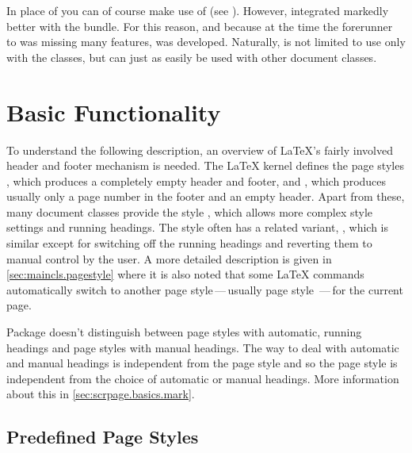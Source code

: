 \begin{Explain}
  In place of  you can of course make use of
   (see \cite{package:fancyhdr}). However,
   integrated markedly better with the {\KOMAScript}
  bundle. For this reason, and because at the time the forerunner to
   was missing many features,  was
  developed. Naturally,  is not limited to use only
  with the {\KOMAScript} classes, but can just as easily be used with
  other document classes.
\end{Explain}


\section{Basic Functionality}\label{sec:scrpage.basics}

\begin{Explain}%
  To understand the following description, an overview of {\LaTeX}'s fairly
  involved header and footer mechanism is needed.  The {\LaTeX} kernel defines
  the page styles , which produces a completely empty header
  and footer, and , which produces usually only a page number
  in the footer and an empty header.  Apart from these, many document classes
  provide the style , which allows more complex style
  settings and running
  headings.  The
   style often has a related variant,
  , which is similar except for switching off the
  running headings and reverting them to manual control
  by the user.  A more detailed description is given in
  \autoref{sec:maincls.pagestyle} where it is also noted that some {\LaTeX}
  commands automatically switch to another page style\,---\,usually page style
  \,---\,for the current page.
\end{Explain}


Package  doesn't distinguish between page styles with
automatic, running headings and page styles with manual headings. The way to
deal with automatic and manual headings is independent from the page style and
so the page style is independent from the choice of automatic or manual
headings. More information about this in \autoref{sec:scrpage.basics.mark}.

  
\subsection{Predefined Page Styles}\label{sec:scrpage.basics.buildIn}

